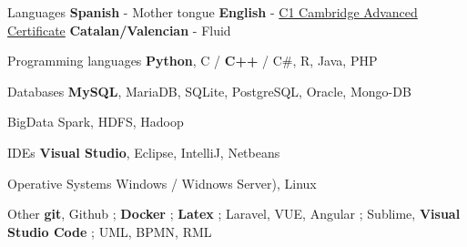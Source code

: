 

\begin{cvskills}
  \cvskill
    {Languages} %
    {\textbf{Spanish} - Mother tongue \acvHeaderSocialSep \textbf{English} - \href{https://bit.ly/48MClKA}{C1 Cambridge Advanced Certificate}  \acvHeaderSocialSep \textbf{Catalan/Valencian} - Fluid} %
    
  \cvskill
	{Programming languages} %
	{\textbf{Python},  C / \textbf{C++} / C\#,  R,  Java,  PHP} %
	
  \cvskill
	{Databases} %
	{\textbf{MySQL},  MariaDB,  SQLite,  PostgreSQL,  Oracle,  Mongo-DB} %
	
  \cvskill
	{BigData} %
	{Spark, HDFS, Hadoop} %
	
  \cvskill
	{IDEs} %
	{\textbf{Visual Studio},  Eclipse,  IntelliJ,  Netbeans} %
 
  \cvskill
	{Operative Systems} %
	{Windows / Widnows Server),  Linux} %
 
  \cvskill
	{Other} %
	{\textbf{git}, Github ; \textbf{Docker} ; \textbf{Latex} ;  Laravel, VUE, Angular ; Sublime, \textbf{Visual Studio Code} ; UML,  BPMN,  RML} %
\end{cvskills}

